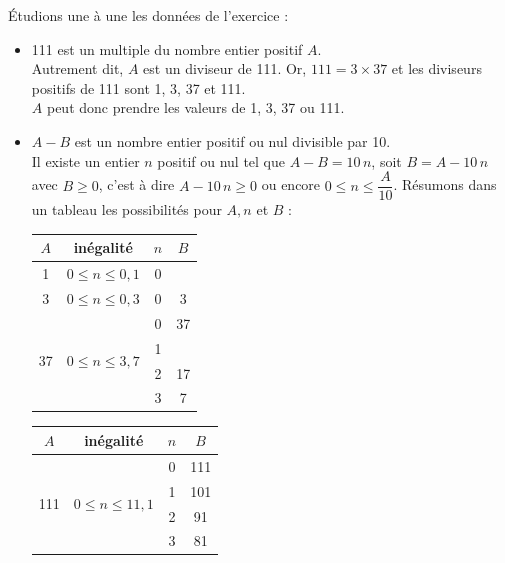 \begin{corrige}
   Étudions une à une les données de l'exercice :
   \begin{itemize}
      \item 111 est un multiple du nombre entier positif $A$. \\
         Autrement dit, $A$ est un diviseur de 111. Or, $111 =3\times37$ et les diviseurs positifs de 111 sont 1, 3, 37 et 111. \\
         $A$ peut donc prendre les valeurs de 1, 3, 37 ou 111.
      \item $A-B$ est un nombre entier positif ou nul divisible par 10. \\
         Il existe un entier $n$ positif ou nul tel que $A-B =10\,n$, soit $B =A-10\,n$ avec $B\geq0$, c'est à dire $A-10\,n\geq0$ ou encore $0\leqslant n\leqslant \dfrac{A}{10}$. Résumons dans un tableau les possibilités pour $A, n$ et $B$ : \\ [1mm]
         \begin{tabular}{|C{0.8}|c|C{0.8}|C{0.8}|}
            \hline
            $A$ & inégalité & $n$ & $B$ \\
             & $0\leqslant n\leqslant 0,1$ & 0 & {} \\
             & $0\leqslant n\leqslant 0,3$ & 0 & 3 \\
            \hline
             &  & 0 & 37 \\
            & & 1 & {} \\
            & & 2 & 17 \\
            & & 3 & 7 \\
            \hline
         \end{tabular}
         \qquad
         \begin{tabular}{|C{0.8}|c|C{0.8}|C{0.8}|}
            \hline
            $A$ & inégalité & $n$ & $B$ \\
            \hline
             &  & 0 & 111 \\
            & & 1 & 101 \\
            & & 2 & 91 \\
            & & 3 & 81 \\

\end{tabular}
\end{itemize}
\end{corrige}
